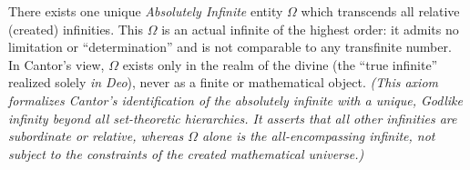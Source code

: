 \begin{axiom}
\label{cantor1897:axiom4}
There exists one unique \emph{Absolutely Infinite} entity $\Omega$ which transcends all relative (created) infinities. This $\Omega$ is an actual infinite of the highest order: it admits no limitation or “determination” and is not comparable to any transfinite number. In Cantor’s view, $\Omega$ exists only in the realm of the divine (the “true infinite” realized solely \emph{in Deo}), never as a finite or mathematical object. \textit{(This axiom formalizes Cantor’s identification of the absolutely infinite with a unique, Godlike infinity beyond all set-theoretic hierarchies. It asserts that all other infinities are subordinate or relative, whereas $\Omega$ alone is the all-encompassing infinite, not subject to the constraints of the created mathematical universe.)}
\end{axiom}

